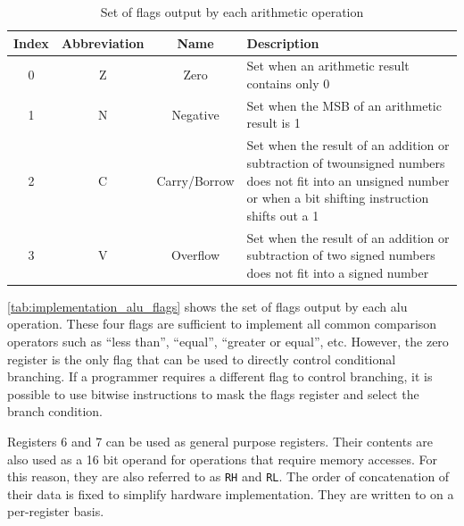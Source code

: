 \begin{table}
    \centering
    \begin{tabularx}{\textwidth}{|c|c|c|X|} 
        \hline
        \textbf{\textbf{Index}} & \textbf{Abbreviation} & \textbf{Name} & \textbf{Description}                                                                                                                                                                                        \\ 
        \hline
        0                       & Z                     & Zero          & Set when an arithmetic result contains only 0                                                                                                                                                               \\ 
        \hline
        1                       & N                     & Negative      & Set when the MSB of an arithmetic result is 1                                                                                                                                                               \\ 
        \hline
        2                       & C                     & Carry/Borrow  & Set when the result of an addition or subtraction of twounsigned numbers does not fit into an unsigned number or when a bit shifting instruction shifts out a 1  \\ 
        \hline
        3                       & V                     & Overflow      & Set when the result of an addition or subtraction of two signed numbers does not fit into a signed number \\
        \hline
    \end{tabularx}
    \caption{Set of flags output by each arithmetic operation}
    \label{tab:implementation_alu_flags}
\end{table}

\autoref{tab:implementation_alu_flags} shows the set of flags output by each \ac{alu} operation. These four flags are sufficient to implement all common comparison operators such as ``less than'', ``equal'', ``greater or equal'', etc. However, the zero register is the only flag that can be used to directly control conditional branching. If a programmer requires a different flag to control branching, it is possible to use bitwise instructions to mask the flags register and select the branch condition.

Registers 6 and 7 can be used as general purpose registers. Their contents are also used as a 16 bit operand for operations that require memory accesses. For this reason, they are also referred to as \texttt{RH} and \texttt{RL}. The order of concatenation of their data is fixed to simplify hardware implementation. They are written to on a per-register basis.

